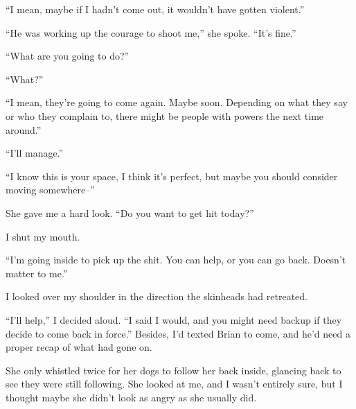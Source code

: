 ``I mean, maybe if I hadn't come out, it wouldn't have gotten violent.''



``He was working up the courage to shoot me,'' she spoke.  ``It's fine.''



``What are you going to do?''



``What?''



``I mean, they're going to come again.  Maybe soon.  Depending on what they say or who they complain to, there might be people with powers the next time around.''



``I'll manage.''



``I know this is your space, I think it's perfect, but maybe you should consider moving somewhere--''



She gave me a hard look.  ``Do you want to get hit today?''



I shut my mouth.



``I'm going inside to pick up the shit.  You can help, or you can go back.  Doesn't matter to me.''



I looked over my shoulder in the direction the skinheads had retreated.



``I'll help,'' I decided aloud. ``I said I would, and you might need backup if they decide to come back in force.''  Besides, I'd texted Brian to come, and he'd need a proper recap of what had gone on.



She only whistled twice for her dogs to follow her back inside, glancing back to see they were still following.  She looked at me, and I wasn't entirely sure, but I thought maybe she didn't look as angry as she usually did.





